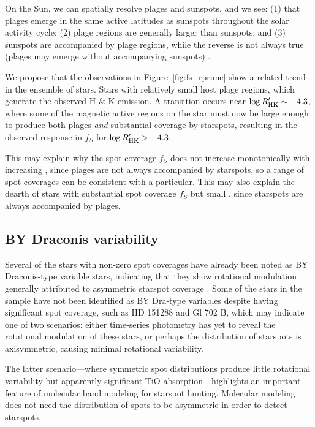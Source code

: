 On the Sun, we can spatially resolve plages and sunspots, and we see: (1) that plages emerge in the same active latitudes as sunspots throughout the solar activity cycle; (2) plage regions are generally larger than sunspots; and (3)  sunspots are accompanied by plage regions, while the reverse is not always true (plages may emerge without accompanying sunspots) \citep{Mandal2017}.

We propose that the observations in Figure~\ref{fig:fs_rprime} show a related trend in the ensemble of stars. Stars with relatively small \logrprime host plage regions, which generate the observed  H \& K emission. A transition occurs near $\log R^\prime_\mathrm{HK} \sim -4.3$, where some of the magnetic active regions on the star must now be large enough to produce both plages \textit{and} substantial coverage by starspots, resulting in the observed response in $f_S$ for $\log R^\prime_\mathrm{HK} > -4.3$. 

This may explain why the spot coverage $f_S$ does not increase monotonically with increasing \logrprime, since plages are not always accompanied by starspots, so a range of spot coverages can be consistent with a particular\logrprime. This may also explain the dearth of stars with substantial spot coverage $f_S$ but small \logrprime, since starspots are always accompanied by plages. 

\subsection{BY Draconis variability}

Several of the stars with non-zero spot coverages have already been noted as BY Draconis-type variable stars, indicating that they show rotational modulation generally attributed to asymmetric starspot coverage \citep{Kron1950, Chugainov1966, Jaschek1990}. Some of the stars in the sample have not been identified as BY Dra-type variables despite having significant spot coverage, such as HD 151288 and Gl 702 B, which may indicate one of two scenarios: either time-series photometry has yet to reveal the rotational modulation of these stars, or perhaps the distribution of starspots is axisymmetric, causing minimal rotational variability. 

The latter scenario---where symmetric spot distributions produce little rotational variability but apparently significant TiO absorption---highlights an important feature of molecular band modeling for starspot hunting. Molecular modeling does not need the distribution of spots to be asymmetric in order to detect starspots. 

